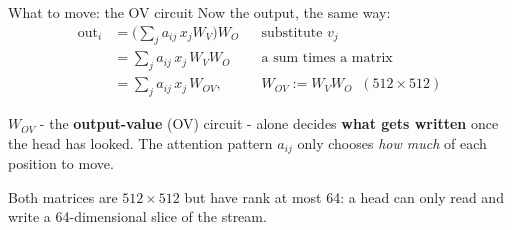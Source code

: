 \documentclass[aspectratio=169]{beamer}
\newcommand{\keybox}[1]{%
  \begin{tcolorbox}[colback=armblue!8, colframe=armblue, boxrule=0.6pt, arc=2pt]
  #1
  \end{tcolorbox}}
\begin{document}
\begin{frame}{What to move: the OV circuit}
  \vspace{0.3em}
  Now the output, the same way:
  \begin{align*}
    \text{out}_i
      &= \Big(\sum_j a_{ij}\, x_j W_V\Big) W_O && \text{substitute } v_j\\
      &= \sum_j a_{ij}\, x_j\, W_V W_O && \text{a sum times a matrix}\\
      &= \sum_j a_{ij}\, x_j\, W_{OV}, && W_{OV} := W_V W_O \;\;(512 \times 512)
  \end{align*}

  \vspace{0.3em}
  \keybox{\small $W_{OV}$ - the \textbf{output-value} (OV) circuit - alone decides \textbf{what gets
  written} once the head has looked. The
  attention pattern $a_{ij}$ only chooses \emph{how much} of each position to move.}

  \vspace{0.2em}
  {\footnotesize Both matrices are $512 \times 512$ but have rank at most 64: a head can only read
  and write a 64-dimensional slice of the stream.}
\end{frame}
\end{document}
